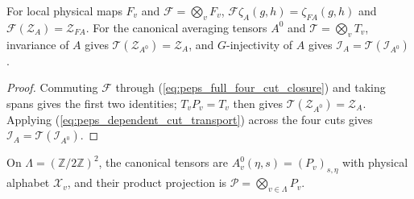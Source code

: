 \begin{lemma}%
    \label{thm:peps_full_four_cut_transport}
    \leanok
    For local physical maps $F_v$ and $\mathcal F=\bigotimes_vF_v$,
    $\mathcal F\zeta_A(g,h)=\zeta_{FA}(g,h)$ and
    $\mathcal F(\mathcal Z_A)=\mathcal Z_{FA}$.
    For the canonical averaging tensors $A^0$ and $\mathcal T=\bigotimes_vT_v$,
    invariance of $A$ gives $\mathcal T(\mathcal Z_{A^0})=\mathcal Z_A$,
    and $G$-injectivity of $A$ gives
    $\mathcal I_A=\mathcal T(\mathcal I_{A^0})$.
\end{lemma}
\begin{proof}\leanok
    Commuting $\mathcal F$ through (\ref{eq:peps_full_four_cut_closure}) and
    taking spans gives the first two identities; $T_vP_v=T_v$ then gives
    $\mathcal T(\mathcal Z_{A^0})=\mathcal Z_A$. Applying
    (\ref{eq:peps_dependent_cut_transport}) across the four cuts gives
    $\mathcal I_A=\mathcal T(\mathcal I_{A^0})$.
\end{proof}

\begin{definition}%
    \label{def:peps_full_four_cut_canonical}
    \leanok
    On $\Lambda=(\mathbb Z/2\mathbb Z)^2$, the canonical tensors are
    $A_v^0(\eta,s)=(P_v)_{s,\eta}$ with physical alphabet $\mathcal X_v$,
    and their product projection is $\mathcal P=\bigotimes_{v\in\Lambda}P_v$.
\end{definition}

